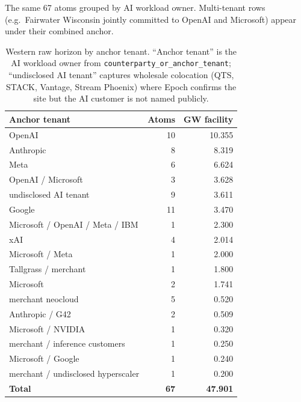 \noindent The same 67 atoms grouped by AI workload owner. Multi-tenant rows (e.g.\ Fairwater Wisconsin jointly committed to OpenAI and Microsoft) appear under their combined anchor.
\begin{table}[H]
\centering\small
\begin{tabular}{@{}lrr@{}}
\toprule
\textbf{Anchor tenant} & \textbf{Atoms} & \textbf{GW facility} \\
\midrule

OpenAI & 10 & 10.355 \\

Anthropic & 8 & 8.319 \\

Meta & 6 & 6.624 \\

OpenAI / Microsoft & 3 & 3.628 \\

undisclosed AI tenant & 9 & 3.611 \\

Google & 11 & 3.470 \\

Microsoft / OpenAI / Meta / IBM & 1 & 2.300 \\

xAI & 4 & 2.014 \\

Microsoft / Meta & 1 & 2.000 \\

Tallgrass / merchant & 1 & 1.800 \\

Microsoft & 2 & 1.741 \\

merchant neocloud & 5 & 0.520 \\

Anthropic / G42 & 2 & 0.509 \\

Microsoft / NVIDIA & 1 & 0.320 \\

merchant / inference customers & 1 & 0.250 \\

Microsoft / Google & 1 & 0.240 \\

merchant / undisclosed hyperscaler & 1 & 0.200 \\

\midrule\textbf{Total} & \textbf{67} & \textbf{47.901} \\

\bottomrule
\end{tabular}
\caption{Western raw horizon by anchor tenant. ``Anchor tenant'' is the AI workload owner from \texttt{counterparty\_or\_anchor\_tenant}; ``undisclosed AI tenant'' captures wholesale colocation (QTS, STACK, Vantage, Stream Phoenix) where Epoch confirms the site but the AI customer is not named publicly.}
\end{table}



